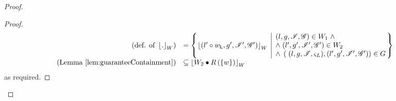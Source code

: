 \begin{lemma}
\begin{proof}
\begin{proof}
\[\begin{array}{r l}
	\left(\text{def. of } \reifyW{.} \right)
	& =
	\left\{
	\hspace*{-0.15cm}
	\begin{array}{l | l}
		\reifyW{\left(l' \composeL \localPart{w}, g', \lmod', \gmod' \right)}
		&
		\hspace*{-0.15cm}
		\begin{array}{l}
			(l, g, \lmod, \gmod) \in W_1 \;\land\\ 
			\land\;(l', g', \lmod', \gmod') \in W_2\\
			\land\; \left(\;(l, g, \lmod, \amod{L}), (l', g', \lmod', \gmod') \right) \in \guarantee
		\end{array}			
		\hspace*{-0.15cm}
	\end{array}
	\hspace*{-0.15cm}
	\right\}\\
	
	
	
	\left(\text{Lemma } \ref{lem:guaranteeContainment} \right)
	& 
	\subseteq	\reifyW{W_2 \composeW \rely\left( \{w\} \right)}

	
\end{array}
\]
%
as required.
\end{proof}
\renewcommand{\qed}{}
\end{proof}
\end{lemma}
%
%

